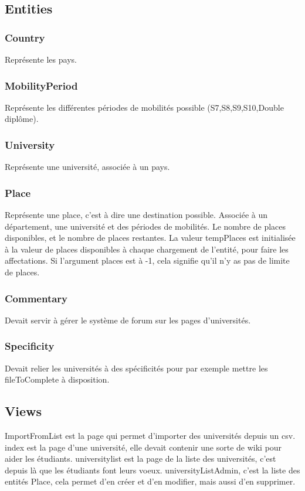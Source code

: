 \subsection{Entities}
\subsubsection{Country}
Représente les pays.

\subsubsection{MobilityPeriod}
Représente les différentes périodes de mobilités possible (S7,S8,S9,S10,Double diplôme).

\subsubsection{University}
Représente une université, associée à un pays.

\subsubsection{Place}
Représente une place, c'est à dire une destination possible. Associée à un département, une université et des périodes de mobilités. Le nombre de places disponibles, et le nombre de places restantes. La valeur tempPlaces est initialisée à la valeur de places disponibles à chaque chargement de l'entité, pour faire les affectations.
Si l'argument places est à -1, cela signifie qu'il n'y as pas de limite de places.


\subsubsection{Commentary}
Devait servir à gérer le système de forum sur les pages d'universités.

\subsubsection{Specificity}
Devait relier les universités à des spécificités pour par exemple mettre les fileToComplete à disposition.

\subsection{Views}
ImportFromList est la page qui permet d'importer des universités depuis un csv.
index est la page d'une université, elle devait contenir une sorte de wiki pour aider les étudiants.
universitylist est la page de la liste des universités, c'est depuis là que les étudiants font leurs voeux.
universityListAdmin, c'est la liste des entités Place, cela permet d'en créer et d'en modifier, mais aussi d'en supprimer.


